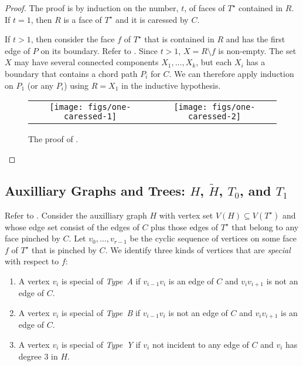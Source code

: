 \documentclass[a4paper,UKenglish]{socg-lipics-v2019}
\newcommand{\dual}[1]{{#1}^\star}
\begin{document}
\begin{proof}
   The proof is by
   induction on the number, $t$, of faces of $\dual{T}$ contained in $R$.
   If $t=1$, then $R$ is a face of $\dual{T}$ and it is caressed by $C$.

   If $t>1$, then consider the face $f$ of $\dual{T}$ that is contained
   in $R$ and has the first edge of $P$ on its boundary.  Refer to
   . Since $t>1$, $X=R\setminus f$ is non-empty. The
   set $X$ may have several connected components $X_1,\ldots,X_k$, but
   each $X_i$ has a boundary that contains a chord path $P_i$ for $C$.
   We can therefore apply induction on $P_1$ (or any $P_i$) using $R=X_1$
   in the inductive hypothesis.
  \begin{figure}
     \begin{center}
	\begin{tabular}{cc}
		\texttt{[image: figs/one-caressed-1]} &
		\texttt{[image: figs/one-caressed-2]}
	\end{tabular}
     \end{center}
	  \caption{The proof of .}
  \end{figure}
\end{proof}

\subsection{Auxilliary Graphs and Trees: $H$, $\tilde{H}$, $T_0$, and $T_1$}

Refer to . Consider the auxilliary
graph $H$ with vertex set $V(H)\subseteq V(\dual{T})$ and whose edge set
consist of the edges of $C$ plus those edges of $\dual{T}$ that belong
to any face pinched by $C$. Let $v_0,\ldots,v_{r-1}$ be the cyclic sequence of vertices on some face $f$ of $\dual{T}$ that is pinched by $C$.  
We identify three kinds of vertices that are \emph{special} with respect to $f$:
\begin{enumerate}
  \item A vertex $v_i$ is special of \emph{Type~A} if $v_{i-1}v_i$ is an edge of $C$ and $v_iv_{i+1}$ is not an edge of $C$.
  \item A vertex $v_i$ is special of \emph{Type~B} if $v_{i-1}v_i$ is not an edge of $C$ and $v_iv_{i+1}$ is an edge of $C$.
  \item A vertex $v_i$ is special of \emph{Type~Y} if $v_i$ not incident to any edge of $C$ and $v_i$ has degree 3 in $H$.
\end{enumerate}
\end{document}
